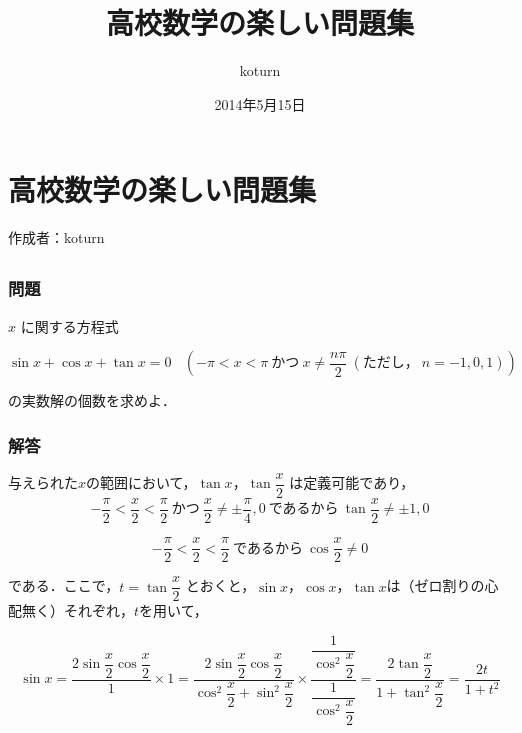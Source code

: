 \documentclass[a4paper,11pt]{jreport}
\title{
  高校数学の楽しい問題集
}
\author{koturn}
\date{2014年5月15日}
\begin{document}
\chapter*{
  高校数学の楽しい問題集
}
\begin{flushright}
  作成者：koturn
\end{flushright}


\renewcommand{\thesection}{問\arabic{section}}
\renewcommand{\thesubsection}{}
\setcounter{section}{0}

\section{}
\subsection*{問題}
$x$ に関する方程式

\begin{equation}
  \sin x + \cos x + \tan x = 0 \:\:\:\: \left( -\pi < x < \pi \: \text{かつ} \: x \neq \dfrac{n \pi}{2} \: (\text{ただし，} \: n = -1, 0, 1) \right)
  \label{eq:sincostan}
\end{equation}

の実数解の個数を求めよ．

\subsection*{解答}
与えられた$x$の範囲において，$\tan x$，$\tan \dfrac{x}{2}$ は定義可能であり，
\begin{equation}
  -\dfrac{\pi}{2} < \dfrac{x}{2} < \dfrac{\pi}{2} \: \text{かつ} \: \dfrac{x}{2} \neq \pm \dfrac{\pi}{4}, 0 \: \text{であるから}\: \tan \dfrac{x}{2} \neq \pm 1, 0
\end{equation}

\begin{equation}
  -\dfrac{\pi}{2} < \dfrac{x}{2} < \dfrac{\pi}{2} \: \text{であるから}\: \cos \dfrac{x}{2} \neq 0
\end{equation}

である．ここで，$t = \tan \dfrac{x}{2}$ とおくと，$\sin x$，$\cos x$，$\tan x$は（ゼロ割りの心配無く）それぞれ，$t$を用いて，

\begin{equation}
  \sin x
  = \dfrac{2 \sin \dfrac{x}{2} \cos \dfrac{x}{2}}{1} \times 1
  = \dfrac{2 \sin \dfrac{x}{2} \cos \dfrac{x}{2}}{\cos^2 \dfrac{x}{2} + \sin^2 \dfrac{x}{2}} \times \dfrac{\dfrac{1}{\cos^2 \dfrac{x}{2}}}{\dfrac{1}{\cos^2 \dfrac{x}{2}}}
  = \dfrac{2 \tan \dfrac{x}{2}}{1 + \tan^2 \dfrac{x}{2}}
  = \dfrac{2t}{1 + t^2}
\end{equation}
\end{document}
